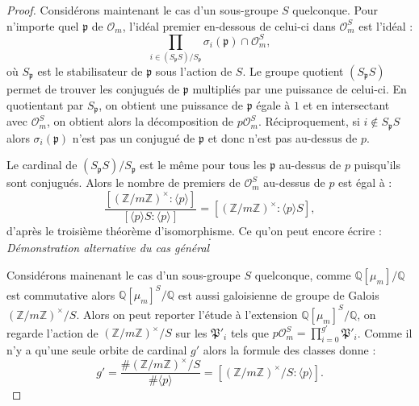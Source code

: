 \documentclass[a4paper]{article} %
\numberwithin{section}{part}
\numberwithin{equation}{section}
\newcommand\zmodninv[1]{(\mathbb{Z}/#1\mathbb{Z})^{\times}}
\newcommand\QQ{\mathbb{Q}}
\newcommand\EO{\mathcal{O}}
\newcommand\groupgen[1]{\langle{#1}\rangle}
\begin{document}
\begin{proof}
Considérons maintenant le cas d'un sous-groupe $S$ quelconque. Pour n'importe 
quel $\mathfrak{p}$ de $\EO_m$, l'idéal premier en-dessous de celui-ci dans 
$\EO_m^S$ est l'idéal :
\begin{equation}
\prod_{i\in\left(S_{\mathfrak{p}}S\right)/S_{\mathfrak{p}}}
{\sigma_i(\mathfrak{p})\cap\EO_m^S},
\end{equation}
où $S_{\mathfrak{p}}$ est le stabilisateur de $\mathfrak{p}$ sous l'action de
$S$. Le groupe quotient $(S_{\mathfrak{p}}S)$ permet de trouver les conjugués de
$\mathfrak{p}$ multipliés par une puissance de celui-ci. En quotientant par
$S_{\mathfrak{p}}$, on obtient une puissance de $\mathfrak{p}$ égale à $1$ et en
intersectant avec $\EO_m^S$, on obtient alors la décomposition de $p\EO_m^S$.
Réciproquement, si $i\notin S_{\mathfrak{p}}S$ alors $\sigma_i(\mathfrak{p})$ 
n'est pas un conjugué de $\mathfrak{p}$ et donc n'est pas au-dessus de $p$.\par
Le cardinal de $(S_{\mathfrak{p}}S)/S_{\mathfrak{p}}$ est le même pour tous les
$\mathfrak{p}$ au-dessus de $p$ puisqu'ils sont conjugués. Alors le nombre de
premiers de $\EO_m^S$ au-dessus de $p$ est égal à :
\begin{equation}
\dfrac{[\zmodninv{m}:\groupgen{p}]}{[\groupgen{p}S:\groupgen{p}]} =
[\zmodninv{m}:\groupgen{p}S],
\end{equation}
d'après le troisième théorème d'isomorphisme. Ce qu'on peut encore écrire
:
\begin{equation}
[\zmodninv{m}/S:\groupgen{p}].
\end{equation}
\vspace{0.3cm}
\emph{Démonstration alternative du cas général}\par
Considérons mainenant le cas d'un sous-groupe $S$ quelconque, comme 
$\QQ[\mu_m]/\QQ$ est commutative alors $\QQ[\mu_m]^S/\QQ$ est aussi galoisienne 
de groupe de Galois $\zmodninv{m}/S$. Alors on peut reporter l'étude à 
l'extension $\QQ[\mu_m]^S/\QQ$, on regarde l'action de $\zmodninv{m}/S$ sur les
$\mathfrak{P}'_i$ tels que $p\EO_m^S = \prod_{i=0}^{g'}{\mathfrak{P}'_i}$. Comme
il n'y a qu'une seule orbite de cardinal $g'$ alors la formule des classes
donne :
\begin{equation}
g' = \frac{\#\zmodninv{m}/S}{\#\groupgen{p}} = 
[\zmodninv{m}/S:\groupgen{p}].
\end{equation}
\end{proof}
\end{document}

